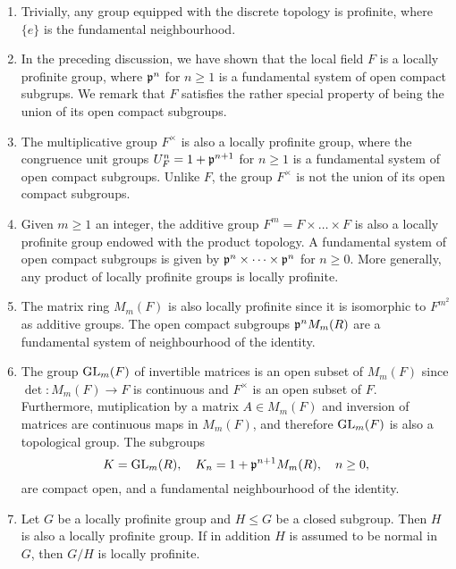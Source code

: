 \begin{examples} \label{example_prof_groups}

    \begin{enumerate}
        \item Trivially, any group equipped with the discrete topology is profinite, where $\{e\}$ is the fundamental neighbourhood.
        \item In the preceding discussion, we have shown that the local field $F$ is a locally profinite group, where $\mathfrak{p}^n$ for $n\geq1$ is a fundamental system of open compact subgrups. We remark that $F$ satisfies the rather special property of being the union of its open compact subgroups. %
        \item The multiplicative group $F^{\times}$ is also a locally profinite group, where the congruence unit groups $U_F^n=1+\mathfrak{p}^{n+1}$ for $n\geq1$ is a fundamental system of open compact subgroups. Unlike $F$, the group $F^{\times}$ is not the union of its open compact subgroups.
        \item Given $m\geq1$ an integer, the additive group $F^m=F\times\dots\times F$ is also a locally profinite group endowed with the product topology. A fundamental system of open compact subgroups is given by $\mathfrak{p}^{n}\times\dots\times\mathfrak{p}^{n}$ for $n\geq0$. More generally, any product of locally profinite groups is locally profinite.
        \item The matrix ring $M_m(F)$ is also locally profinite since it is isomorphic to $F^{m^2}$ as additive groups. The open compact subgroups $\mathfrak{p}^n M_m(R)$ are a fundamental system of neighbourhood of the identity.
        \item The group $\mathrm{GL}_m(F)$ of invertible matrices is an open subset of $M_m(F)$ since $\det:M_m(F)\rightarrow F$ is continuous and $F^{\times}$ is an open subset of $F$. Furthermore, mutiplication by a matrix $A\in M_m(F)$ and inversion of matrices are continuous maps in $M_m(F)$, and therefore $\mathrm{GL}_m(F)$ is also a topological group. The subgroups
        $$K=\mathrm{GL}_m(R),\quad K_n=1+\mathfrak{p}^{n+1}M_m(R),\quad n\geq 0,$$
        are compact open, and a fundamental neighbourhood of the identity.
        \item Let $G$ be a locally profinite group and $H\leq G$ be a closed subgroup. Then $H$ is also a locally profinite group. If in addition $H$ is assumed to be normal in $G$, then $G/H$ is locally profinite. 
        
    \end{enumerate}
\end{examples}

